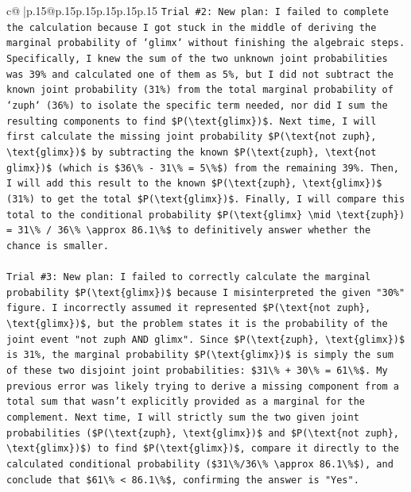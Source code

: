 \documentclass{article}
\begin{document}
{\begin{supertabular}{c@{$\;$}|p{.15\linewidth}@{}p{.15\linewidth}p{.15\linewidth}p{.15\linewidth}p{.15\linewidth}p{.15\linewidth}}
{{{\texttt{Trial \#2: New plan: I failed to complete the calculation because I got stuck in the middle of deriving the marginal probability of `glimx` without finishing the algebraic steps. Specifically, I knew the sum of the two unknown joint probabilities was 39\% and calculated one of them as 5\%, but I did not subtract the known joint probability (31\%) from the total marginal probability of `zuph` (36\%) to isolate the specific term needed, nor did I sum the resulting components to find \$P(\textbackslash{}text\{glimx\})\$. Next time, I will first calculate the missing joint probability \$P(\textbackslash{}text\{not zuph\}, \textbackslash{}text\{glimx\})\$ by subtracting the known \$P(\textbackslash{}text\{zuph\}, \textbackslash{}text\{not glimx\})\$ (which is \$36\textbackslash{}\% {-} 31\textbackslash{}\% = 5\textbackslash{}\%\$) from the remaining 39\%. Then, I will add this result to the known \$P(\textbackslash{}text\{zuph\}, \textbackslash{}text\{glimx\})\$ (31\%) to get the total \$P(\textbackslash{}text\{glimx\})\$. Finally, I will compare this total to the conditional probability \$P(\textbackslash{}text\{glimx\} \textbackslash{}mid \textbackslash{}text\{zuph\}) = 31\textbackslash{}\% / 36\textbackslash{}\% \textbackslash{}approx 86.1\textbackslash{}\%\$ to definitively answer whether the chance is smaller.} \\
\\ 
\texttt{Trial \#3: New plan: I failed to correctly calculate the marginal probability \$P(\textbackslash{}text\{glimx\})\$ because I misinterpreted the given "30\%" figure. I incorrectly assumed it represented \$P(\textbackslash{}text\{not zuph\}, \textbackslash{}text\{glimx\})\$, but the problem states it is the probability of the joint event "not zuph AND glimx". Since \$P(\textbackslash{}text\{zuph\}, \textbackslash{}text\{glimx\})\$ is 31\%, the marginal probability \$P(\textbackslash{}text\{glimx\})\$ is simply the sum of these two disjoint joint probabilities: \$31\textbackslash{}\% + 30\textbackslash{}\% = 61\textbackslash{}\%\$. My previous error was likely trying to derive a missing component from a total sum that wasn't explicitly provided as a marginal for the complement. Next time, I will strictly sum the two given joint probabilities (\$P(\textbackslash{}text\{zuph\}, \textbackslash{}text\{glimx\})\$ and \$P(\textbackslash{}text\{not zuph\}, \textbackslash{}text\{glimx\})\$) to find \$P(\textbackslash{}text\{glimx\})\$, compare it directly to the calculated conditional probability (\$31\textbackslash{}\%/36\textbackslash{}\% \textbackslash{}approx 86.1\textbackslash{}\%\$), and conclude that \$61\textbackslash{}\% < 86.1\textbackslash{}\%\$, confirming the answer is "Yes".} \\
}}}
\end{supertabular}}
\end{document}
